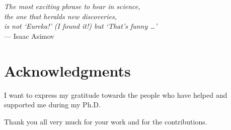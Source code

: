 
\begin{flushright}{\slshape
    The most exciting phrase to hear in science, \\
	the one that heralds new discoveries, \\
	is not `Eureka!' (I found it!) but `That’s funny …'} \\ \medskip
    --- Isaac Asimov
\end{flushright}




\begingroup
\let\clearpage\relax
\let\cleardoublepage\relax
\let\cleardoublepage\relax
\chapter*{Acknowledgments}

I want to express my gratitude towards the people who have helped and supported me during my Ph.D.


\lipsum[1-2]

\bigskip

Thank you all very much for your work and for the contributions.

\endgroup



